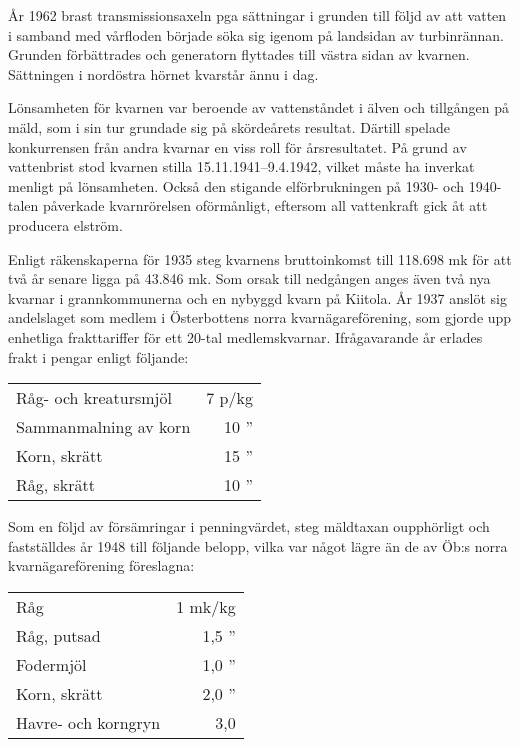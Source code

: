 År 1962 brast transmissionsaxeln pga sättningar i grunden till följd av att vatten i samband med vårfloden började söka sig igenom på landsidan av turbinrännan. Grunden förbättrades och generatorn flyttades till västra sidan av kvarnen. Sättningen i nordöstra hörnet kvarstår ännu i dag.

Lönsamheten för kvarnen var beroende av vattenståndet i älven och tillgången på mäld, som i sin tur grundade sig på skördeårets resultat. Därtill spelade konkurrensen från andra kvarnar en viss roll för årsresultatet. På grund av vattenbrist stod kvarnen stilla 15.11.1941--9.4.1942, vilket måste ha inverkat menligt på lönsamheten. Också den stigande elförbrukningen på 1930- och 1940-talen påverkade kvarnrörelsen oförmånligt, eftersom all vattenkraft gick åt att producera elström.

Enligt räkenskaperna för 1935 steg kvarnens bruttoinkomst till 118.698 mk för att två år senare ligga på 43.846 mk. Som orsak till nedgången anges även två nya kvarnar i grannkommunerna och en nybyggd kvarn på Kiitola. År 1937 anslöt sig andelslaget som medlem i Österbottens norra kvarnägareförening, som gjorde upp enhetliga frakttariffer för ett 20-tal medlemskvarnar. Ifrågavarande år erlades frakt i pengar enligt följande:

\begin{center}
  \begin{tabular}{l r}
    \hline
    Råg- och kreatursmjöl & 7  p/kg \\
    Sammanmalning av korn	&	10 '' \\
    Korn, skrätt &	15 '' \\
    Råg, skrätt	&	10 '' \\
    \hline
  \end{tabular}
\end{center}
Som en följd av försämringar i penningvärdet, steg mäldtaxan oupphörligt och fastställdes år 1948 till följande belopp, vilka var något lägre än de av Öb:s norra kvarnägareförening föreslagna:
\begin{center}
  \begin{tabular}{l r}
    \hline
    Råg & 1 mk/kg \\
    Råg, putsad & 1,5 '' \\
    Fodermjöl & 1,0 '' \\
    Korn, skrätt & 2,0 '' \\
    Havre- och korngryn & 3,0 \\
    \hline
  \end{tabular}
\end{center}

